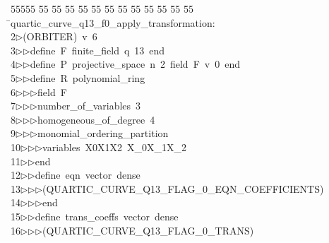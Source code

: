 %
%
\begin{tabbing}
55555 \= 55 \= 55 \= 55 \= 55 \= 55 \= 55 \= 55 \= 55 \= 55 \= 55 \= 55 \= 55 \= \>quartic\_curve\_q13\_f0\_apply\_transformation:\\[0pt]
2\>$\triangleright$\>(ORBITER)\ v\ 6\ \\[0pt]
3\>$\triangleright$\>$\triangleright$\>define\ F\ finite\_field\ q\ 13\ end\ \\[0pt]
4\>$\triangleright$\>$\triangleright$\>define\ P\ projective\_space\ n\ 2\ field\ F\ v\ 0\ end\ \\[0pt]
5\>$\triangleright$\>$\triangleright$\>define\ R\ polynomial\_ring\ \\[0pt]
6\>$\triangleright$\>$\triangleright$\>$\triangleright$\>field\ F\ \\[0pt]
7\>$\triangleright$\>$\triangleright$\>$\triangleright$\>number\_of\_variables\ 3\ \\[0pt]
8\>$\triangleright$\>$\triangleright$\>$\triangleright$\>homogeneous\_of\_degree\ 4\ \\[0pt]
9\>$\triangleright$\>$\triangleright$\>$\triangleright$\>monomial\_ordering\_partition\ \\[0pt]
10\>$\triangleright$\>$\triangleright$\>$\triangleright$\>variables\ X0X1X2\ X\_0X\_1X\_2\ \\[0pt]
11\>$\triangleright$\>$\triangleright$\>end\ \\[0pt]
12\>$\triangleright$\>$\triangleright$\>define\ eqn\ vector\ dense\ \\[0pt]
13\>$\triangleright$\>$\triangleright$\>$\triangleright$\>(QUARTIC\_CURVE\_Q13\_FLAG\_0\_EQN\_COEFFICIENTS)\ \\[0pt]
14\>$\triangleright$\>$\triangleright$\>$\triangleright$\>end\ \\[0pt]
15\>$\triangleright$\>$\triangleright$\>define\ trans\_coeffs\ vector\ dense\ \\[0pt]
16\>$\triangleright$\>$\triangleright$\>$\triangleright$\>(QUARTIC\_CURVE\_Q13\_FLAG\_0\_TRANS)\ \\[0pt]

\end{tabbing}
